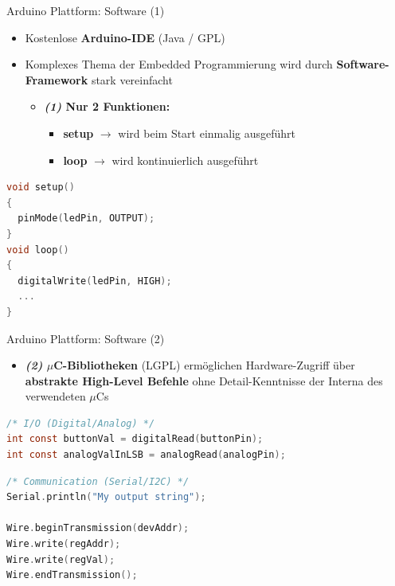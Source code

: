\documentclass{beamer}
\begin{document}
\begin{frame}[fragile]{Arduino Plattform: Software (1)}
\begin{itemize}
	\item Kostenlose \textbf{Arduino-IDE} (Java / GPL)
\end{itemize}
\begin{itemize}
	\item Komplexes Thema der Embedded Programmierung wird durch \textbf{Software-Framework} stark vereinfacht
	\begin{itemize}
	 	\item \textbf{\textit{(1)} Nur 2 Funktionen:}
	 	\begin{itemize}
	 		\item \textbf{setup} $\rightarrow$ wird beim Start einmalig ausgef\"uhrt
	 		\item \textbf{loop} $\rightarrow$ wird kontinuierlich ausgef\"uhrt
	 	\end{itemize}
	 \end{itemize}
\end{itemize}
\begin{lstlisting}[frame=single, language=C]
void setup()
{
  pinMode(ledPin, OUTPUT);
}
void loop()
{
  digitalWrite(ledPin, HIGH);
  ...
}
\end{lstlisting}
\end{frame}
\begin{frame}[fragile]{Arduino Plattform: Software (2)}
\begin{itemize}
 	\item \textbf{\textit{(2)} $\mu$C-Bibliotheken} (LGPL) erm\"oglichen Hardware-Zugriff \"uber \textbf{abstrakte High-Level Befehle} ohne Detail-Kenntnisse der Interna des verwendeten $\mu$Cs
\end{itemize}
\begin{lstlisting}[frame=single, language=C]
/* I/O (Digital/Analog) */
int const buttonVal = digitalRead(buttonPin);
int const analogValInLSB = analogRead(analogPin); 
\end{lstlisting}
\begin{lstlisting}[frame=single, language=C]
/* Communication (Serial/I2C) */
Serial.println("My output string");

Wire.beginTransmission(devAddr);
Wire.write(regAddr);
Wire.write(regVal);
Wire.endTransmission();
\end{lstlisting}
\end{frame}
\end{document}
